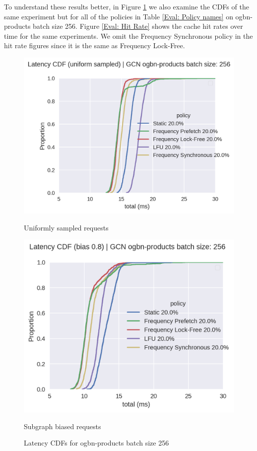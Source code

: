 To understand these results better, in Figure \ref{Eval: Latency CDF} we also examine the CDFs of the same experiment but for all of the policies in Table \ref{Eval: Policy names} on ogbn-products batch size 256. Figure \ref{Eval: Hit Rate} shows the cache hit rates over time for the same experiments. We omit the Frequency Synchronous policy in the hit rate figures since it is the same as Frequency Lock-Free.

\begin{figure}[h!]
    \centering
    \begin{minipage}[c]{0.48\textwidth}
        \centering
        \includegraphics[width=\textwidth]{figures/CDF_GCN_uniform_pinnedc0.2.png}
        \caption*{Uniformly sampled requests}
    \end{minipage}
    \hfill
    \begin{minipage}[c]{0.48\textwidth}
        \centering
        \includegraphics[width=\textwidth]{figures/CDF_GCN_bias_pinnedc0.2.png}    
        \caption*{Subgraph biased requests}
    \end{minipage}
    \caption{Latency CDFs for ogbn-products batch size 256}
    \label{Eval: Latency CDF}
\end{figure}    

